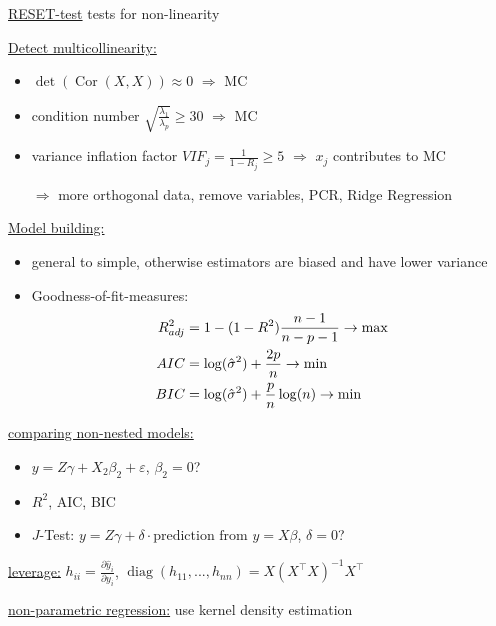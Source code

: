 \documentclass[10pt,landscape,a4paper]{article}
\DeclareMathOperator{\Cor}{Cor}
\DeclareMathOperator{\diag}{diag}
\begin{document}
\begin{multicols*}{4}
\underline{RESET-test} tests for non-linearity

\underline{Detect multicollinearity:}
\begin{itemize}
	\item $\det(\Cor(X,X)) \approx 0$ $\Rightarrow$ MC
	\item condition number $\sqrt{\frac{\lambda_1}{\lambda_p}} \ge 30$ $\Rightarrow$ MC
	\item variance inflation factor $VIF_j = \frac{1}{1-R_j} \ge 5$ $\Rightarrow$ $x_j$ contributes to MC
	\item[$\Rightarrow$] more orthogonal data, remove variables, PCR, Ridge Regression
\end{itemize}
\underline{Model building:}
\begin{itemize}
	\item general to simple, otherwise estimators are biased and have lower variance
	\item Goodness-of-fit-measures:
	\begin{align}
		R^2_{adj} &= 1-(1-R^2)\frac{n-1}{n-p-1}\to\max \notag \\
		AIC &= \log(\hat{\sigma}^2) + \frac{2p}{n}\to\min \notag \\
		BIC &= \log(\hat{\sigma}^2) + \frac{p}{n}\log(n)\to\min \notag
	\end{align}
\end{itemize}
\underline{comparing non-nested models:}
\begin{itemize}
	\item $y = Z\gamma + X_2\beta_2 + \varepsilon$, $\beta_2 = 0$?
	\item $R^2$, AIC, BIC
	\item $J$-Test: $y = Z\gamma + \delta\cdot\text{prediction from } y = X\beta$, $\delta = 0$?
\end{itemize}
\underline{leverage:} $h_{ii} = \frac{\partial \hat{y}_i}{\partial y_i}$, $\diag(h_{11},...,h_{nn}) = X(X^\top X)^{-1}X^\top$

\underline{non-parametric regression:} use kernel density estimation


\end{multicols*}
\end{document}
